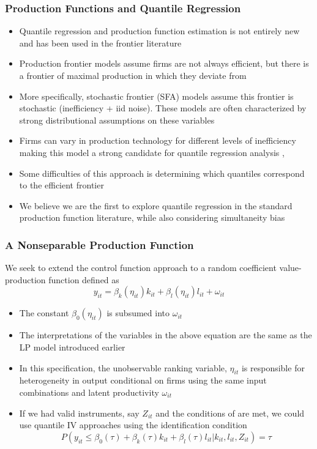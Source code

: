 \documentclass{beamer}
\begin{document}

\begin{frame}
\frametitle{Production Functions and Quantile Regression}
\begin{itemize}
	\item Quantile regression and production function estimation is not entirely new and has been used in the frontier literature
	\item Production frontier models assume firms are not always efficient, but there is a frontier of maximal production in which they deviate from
	\item More specifically, stochastic frontier (SFA) models assume this frontier is stochastic (inefficiency + iid noise). These models are often characterized by strong distributional assumptions on these variables
	\item Firms can vary in production technology for different levels of inefficiency making this model a strong candidate for quantile regression analysis \parencite{Bernini2004}, \parencite{Liu2008}
	\item Some difficulties of this approach is determining which quantiles correspond to the efficient frontier
	\item We believe we are the first to explore quantile regression in the standard production function literature, while also considering simultaneity bias
\end{itemize}
\end{frame}



\begin{frame}
\frametitle{A Nonseparable Production Function}
We seek to extend the control function approach to a random coefficient value-production function defined as
\begin{equation} \label{qpf}
	y_{it}=\beta_{k}(\eta_{it})k_{it}+\beta_{l}(\eta_{it})l_{it}+\omega_{it}
\end{equation}
\begin{itemize}
	\item The constant $\beta_{0}(\eta_{it})$ is subsumed into $\omega_{it}$
	\item The interpretations of the variables in the above equation are the same as the LP model introduced earlier
	\item In this specification, the unobservable ranking variable, $\eta_{it}$ is responsible for heterogeneity in output conditional on firms using the same input combinations and latent productivity $\omega_{it}$
	\item If we had valid instruments, say $Z_{it}$ and the conditions of \textcite{Chernozhukov2005} are met, we could use quantile IV approaches using the identification condition
	\begin{equation}
	P(y_{it}\leq\beta_{0}(\tau)+\beta_{k}(\tau)k_{it}+\beta_{l}(\tau)l_{it}|k_{it}, l_{it}, Z_{it})=\tau
	\end{equation}
\end{itemize}
\end{frame}
\end{document}
